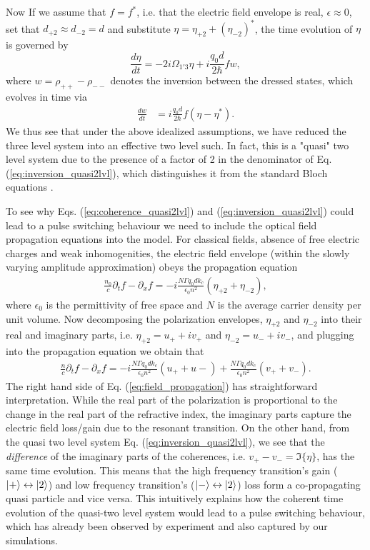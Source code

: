 \documentclass[]{spie}  %
\def\p{\partial}
\begin{document}
Now If we assume that $f = f^*$, i.e. that the electric field envelope is real, $\epsilon \approx 0$, set that $d_{+2}\approx d_{-2} = d$ and substitute $\eta = \eta_{+2}+(\eta_{-2})^*$, the time evolution of $\eta$ is governed by
\begin{equation}
\label{eq:coherence_quasi2lvl}
\frac{d \eta}{dt} = -2i\Omega_{1'3} \eta + i\frac{q_0d}{2\hbar}fw, 
\end{equation}
where $w = \rho_{++}-\rho_{--}$ denotes the inversion between the dressed states, which evolves in time via 
\begin{align}
\label{eq:inversion_quasi2lvl}
\frac{d w }{dt}	&=  i\frac{q_0d}{2\hbar}f(\eta-\eta^*).
\end{align}
We thus see that under the above idealized assumptions, we have reduced the three level system into an effective two level such. In fact, this is a "quasi" two level system due to the presence of a factor of 2 in the denominator of Eq. (\ref{eq:inversion_quasi2lvl}), which distinguishes it from the standard Bloch equations \cite{boyd2003nonlinear}.

To see why Eqs. (\ref{eq:coherence_quasi2lvl}) and (\ref{eq:inversion_quasi2lvl}) could lead to a pulse switching behaviour we need to include the optical field propagation equations into the model. For classical fields, absence of free electric charges and weak inhomogenities, the electric field envelope (within the slowly varying amplitude approximation) obeys the propagation equation
\begin{align}
	\frac{n_0}{c} \p_t f - \p_x f = -i\frac{N \Gamma q_0d k_c}{\epsilon_0 n^2}(\eta_{+2}+\eta_{-2}),
\end{align}
where $\epsilon_0$ is the permittivity of free space and $N$ is the average carrier density per unit volume. Now decomposing the polarization envelopes, $\eta_{+2}$ and $\eta_{-2}$ into their real and imaginary parts, i.e. $\eta_{+2} = u_{+}+iv_{+}$ and $\eta_{-2} = u_{-}+iv_{-}$, and plugging into the propagation equation we obtain that
\begin{align}
\label{eq:field_propagation}
\frac{n}{c} \p_t f - \p_x f = -i\frac{N \Gamma q_0d k_c}{\epsilon_0 n^2}(u_{+}+u{-}) + \frac{N \Gamma q_0d k_c}{\epsilon_0 n^2}(v_{+}+v_{-}).
\end{align}
The right hand side of Eq. (\ref{eq:field_propagation}) has straightforward interpretation. While the real part of the polarization is proportional to the change in the real part of the refractive index, the imaginary parts capture the electric field loss/gain due to the resonant transition. On the other hand, from the quasi two level system Eq. (\ref{eq:inversion_quasi2lvl}), we see that the \emph{difference} of the imaginary parts of the coherences, i.e. $v_{+}-v_{-} = \Im\{\eta\}$, has the same time evolution. This means that the high frequency transition's gain ($\ket{+}\leftrightarrow\ket{2}$) and low frequency transition's ($\ket{-}\leftrightarrow\ket{2}$) loss form a co-propagating quasi particle and vice versa. This intuitively explains how the coherent time evolution of the quasi-two level system would lead to a pulse switching behaviour, which has already been observed by experiment\cite{burghoff2015evaluating} and also captured by our simulations.
 
\end{document}
